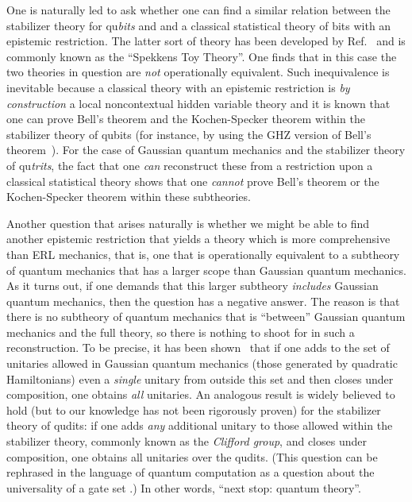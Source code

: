 \documentclass[pra,superscriptaddress,nofootinbib,12pt]{revtex4-2}
\begin{document}
One is naturally led to ask whether one can find a similar relation between the stabilizer theory for qu\emph{bits} and and a classical statistical theory of bits with an epistemic restriction.  The latter sort of theory has been developed by Ref.~\cite{Spe07} and is commonly known as the ``Spekkens Toy Theory''.  One finds that in this case the two theories in question are \emph{not} operationally equivalent.  Such inequivalence is inevitable because a classical theory with an epistemic restriction is \emph{by construction} a local noncontextual hidden variable theory and it is known that one can prove Bell's theorem and the Kochen-Specker theorem within the stabilizer theory of qubits (for instance, by using the GHZ version of Bell's theorem~\cite{GHZ}).  For the case of Gaussian quantum mechanics and the stabilizer theory of qu\emph{trits}, the fact that one \emph{can} reconstruct these from a restriction upon a classical statistical theory shows that one \emph{cannot} prove Bell's theorem or the Kochen-Specker theorem within these subtheories.

Another question that arises naturally is whether we might be able to find another epistemic restriction that yields a theory which is more comprehensive than ERL mechanics, that is, one that is operationally equivalent to a subtheory of quantum mechanics that has a larger scope than Gaussian quantum mechanics. 
As it turns out, if one demands that this larger subtheory \emph{includes} Gaussian quantum mechanics, then the question has a negative answer.  The reason is that there is no subtheory of quantum mechanics that is ``between'' Gaussian quantum mechanics and the full theory, so there is nothing to shoot for in such a reconstruction.  To be precise, it has been shown~\cite{Lloyd99,Bar02} that if one adds to the set of unitaries allowed in Gaussian quantum mechanics (those generated by quadratic Hamiltonians) even a \emph{single} unitary from outside this set and then closes under composition, one obtains \emph{all} unitaries. An analogous result is widely believed to hold (but to our knowledge has not been rigorously proven) for the stabilizer theory of qudits: if one adds \emph{any} additional unitary to those allowed within the stabilizer theory, commonly known as the \emph{Clifford group}, and closes under composition, one obtains all unitaries over the qudits. (This question can be rephrased in the language of quantum computation as a question about the universality of a gate set \cite{Bar95}.)  In other words, ``next stop: quantum theory''.
\end{document}

